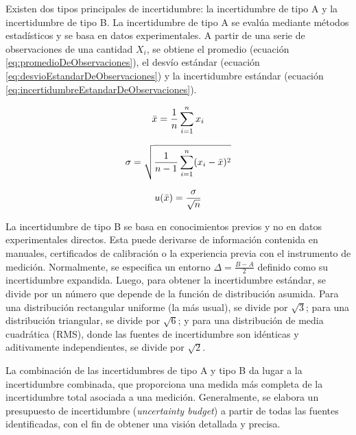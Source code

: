 Existen dos tipos principales de incertidumbre: la incertidumbre de tipo A y la incertidumbre de tipo B. La incertidumbre de tipo A se evalúa mediante métodos estadísticos y se basa en datos experimentales. A partir de una serie de observaciones de una cantidad $X_{i}$, se obtiene el promedio (ecuación \ref{eq:promedioDeObservaciones}), el desvío estándar (ecuación \ref{eq:desvioEstandarDeObservaciones}) y la incertidumbre estándar (ecuación \ref{eq:incertidumbreEstandarDeObservaciones}).


\begin{equation}
    \centering
    \bar{x} = \frac{1}{n}\sum_{i=1}^{n} x_{i}
    \label{eq:promedioDeObservaciones}
\end{equation}

\begin{equation}
    \centering
    \sigma = \sqrt{\frac{1}{n-1} \sum_{i=1}^{n} (x_i - \bar{x})^2}
    \label{eq:desvioEstandarDeObservaciones}
\end{equation}

\begin{equation}
    \centering
    u(\bar{x}) = \frac{\sigma}{\sqrt{n}}
    \label{eq:incertidumbreEstandarDeObservaciones}
\end{equation}

La incertidumbre de tipo B se basa en conocimientos previos y no en datos experimentales directos. Esta puede derivarse de información contenida en manuales, certificados de calibración o la experiencia previa con el instrumento de medición. Normalmente, se especifica un entorno $\Delta = \frac{B-A}{2}$ definido como su incertidumbre expandida. Luego, para obtener la incertidumbre estándar, se divide por un número que depende de la función de distribución asumida. Para una distribución rectangular uniforme (la más usual), se divide por $\sqrt{3}$; para una distribución triangular, se divide por $\sqrt{6}$; y para una distribución de media cuadrática (RMS), donde las fuentes de incertidumbre son idénticas y aditivamente independientes, se divide por $\sqrt{2}$.

La combinación de las incertidumbres de tipo A y tipo B da lugar a la incertidumbre combinada, que proporciona una medida más completa de la incertidumbre total asociada a una medición. Generalmente, se elabora un presupuesto de incertidumbre (\textit{uncertainty budget}) a partir de todas las fuentes identificadas, con el fin de obtener una visión detallada y precisa.

